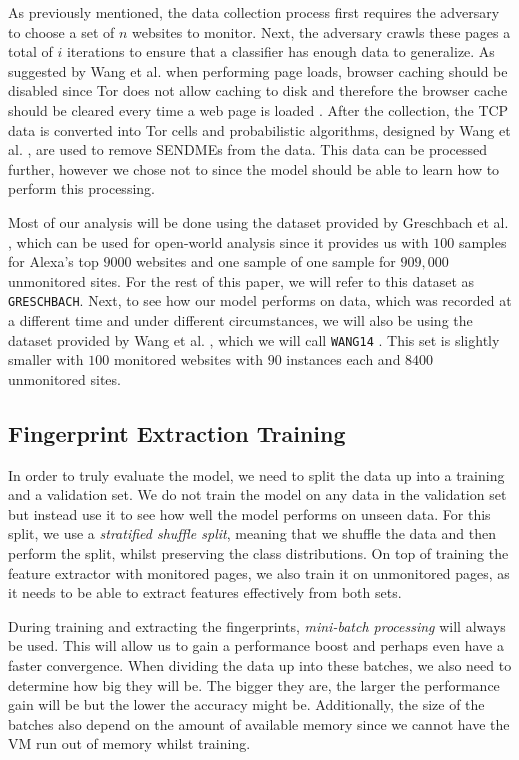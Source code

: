 As previously mentioned, the data collection process first requires the adversary to choose a set of $n$ websites to monitor.
Next, the adversary crawls these pages a total of $i$ iterations to ensure that a classifier has enough data to generalize.
As suggested by Wang et al. when performing page loads, browser caching should be disabled since Tor does not allow caching to disk and therefore the browser cache should be cleared every time a web page is loaded \cite{wang_goldberg_2013}.
After the collection, the TCP data is converted into Tor cells and probabilistic algorithms, designed by Wang et al. \cite{wang_goldberg_2013}, are used to remove SENDMEs from the data.
This data can be processed further, however we chose not to since the model should be able to learn how to perform this processing.

Most of our analysis will be done using the dataset provided by Greschbach et al. \cite{greschbach2016effect}, which can be used for open-world analysis since it provides us with $100$ samples for Alexa's top $9000$ websites and one sample of one sample for $909,000$ unmonitored sites.
For the rest of this paper, we will refer to this dataset as \texttt{GRESCHBACH}.
Next, to see how our model performs on data, which was recorded at a different time and under different circumstances, we will also be using the dataset provided by Wang et al. \cite{wang_cai_johnson_nithyanand_goldberg_2014}, which we will call \texttt{WANG14} \cite{panchenko2}.
This set is slightly smaller with $100$ monitored websites with $90$ instances each and $8400$ unmonitored sites.

\subsection{Fingerprint Extraction Training} \label{sec:fingerprint-extraction-training}

In order to truly evaluate the model, we need to split the data up into a training and a validation set.
We do not train the model on any data in the validation set but instead use it to see how well the model performs on unseen data.
For this split, we use a \textit{stratified shuffle split}, meaning that we shuffle the data and then perform the split, whilst preserving the class distributions.
On top of training the feature extractor with monitored pages, we also train it on unmonitored pages, as it needs to be able to extract features effectively from both sets.

During training and extracting the fingerprints, \textit{mini-batch processing} will always be used.
This will allow us to gain a performance boost and perhaps even have a faster convergence.
When dividing the data up into these batches, we also need to determine how big they will be.
The bigger they are, the larger the performance gain will be but the lower the accuracy might be.
Additionally, the size of the batches also depend on the amount of available memory since we cannot have the VM run out of memory whilst training.

